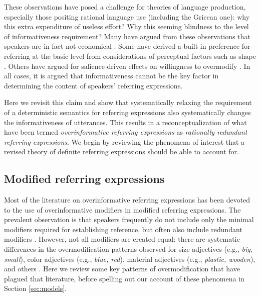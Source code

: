 \documentclass[11pt]{article}
\newcommand{\sectionref}[1]{Section \ref{#1}}
\begin{document}
These observations have posed a challenge for theories of language production, especially those positing rational language use (including the Gricean one): why this extra expenditure of useless effort? Why this seeming blindness to the level of informativeness requirement? Many have argued from these observations that speakers are in fact not economical \cite{Engelhardt2006, Pechmann1989}. Some have derived a built-in preference for referring at the basic level from considerations of perceptual factors such as shape \cite{Rosch1976, Rosch1973, murphy1982basic}. Others have argued for salience-driven effects on willingness to overmodify \cite{Gatt2014, Westerbeek2015}. In all cases, it is argued that informativeness cannot be the key factor in determining the content of speakers' referring expressions. 

Here we revisit this claim and show that systematically relaxing the requirement of a deterministic semantics for referring expressions also systematically changes the informativeness of utterances. This results in a reconceptualization of what have been termed \emph{overinformative referring expressions} as \emph{rationally redundant referring expressions}. We begin by reviewing the phenomena of interest that a revised theory of definite referring expressions should be able to account for. 

\subsection{Modified referring expressions}
\label{sec:modified}


Most of the literature on overinformative referring expressions has been devoted to the use of overinformative modifiers in modified referring expressions. The prevalent observation is that speakers frequently do not include only the minimal modifiers required for establishing reference, but often also include redundant modifiers \cite{Pechmann1989, nadig2002, Maes2004, Engelhardt2006, Arts2011, Koolen2011}. However, not all modifiers are created equal: there are systematic differences in the overmodification patterns observed for size adjectives (e.g., \emph{big, small}), color adjectives (e.g., \emph{blue, red}), material adjectives (e.g., \emph{plastic, wooden}), and others \cite{sedivy2003a}. Here we review some key patterns of overmodification that have plagued that literature, before spelling out our account of these phenomena in \sectionref{sec:models}.
\end{document}
